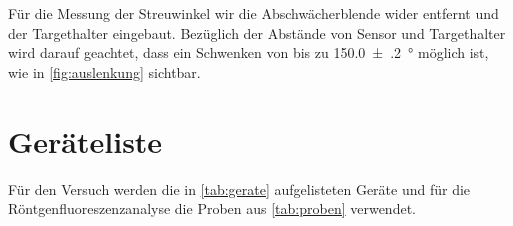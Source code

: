 \documentclass[12pt,english,ngerman]{scrartcl}
\begin{document}
\begin{figure}[H]
	\centering
	 \hfill
\end{figure}

Für die Messung der Streuwinkel wir die Abschwächerblende wider entfernt und
der Targethalter eingebaut. Bezüglich der Abstände von Sensor und Targethalter
wird darauf geachtet, dass ein Schwenken von bis zu \SI{150.0(2)}{\degree}
möglich ist, wie in \autoref{fig:auslenkung} sichtbar.

\section{Geräteliste}\label{sec:geraeteliste}

Für den Versuch werden die in \autoref{tab:gerate} aufgelisteten Geräte und für
die Röntgenfluoreszenzanalyse die Proben aus \autoref{tab:proben} verwendet.
\end{document}
